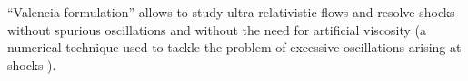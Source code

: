 %
``Valencia formulation'' allows to study ultra-relativistic flows and resolve shocks without
spurious oscillations and without the need for artificial viscosity (a numerical technique used to 
tackle the problem of excessive oscillations arising at shocks \citep[\eg][]{Font:2008fka}).
%

%
%
%
%
